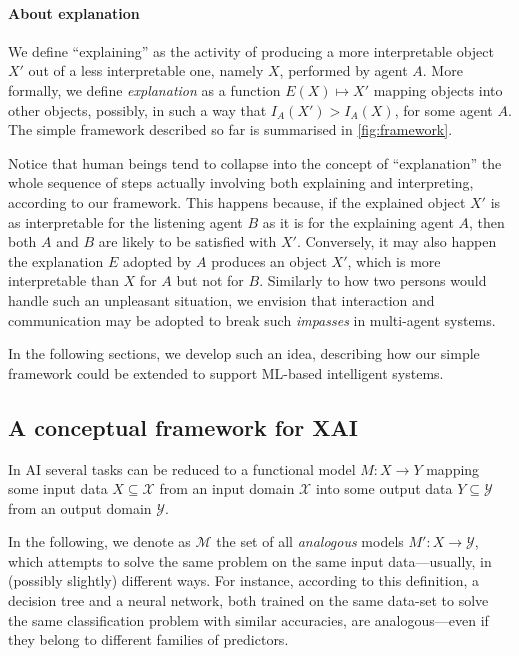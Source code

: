 \documentclass[12pt,a4paper,openright,twoside]{book}
\begin{document}
\paragraph{About explanation}

We define ``explaining'' as the activity of producing a more interpretable object $X'$ out of a less interpretable one, namely $X$, performed by agent $A$.
%
More formally, we define \emph{explanation} as a function $E(X) \mapsto X'$ mapping objects into other objects, possibly, in such a way that $I_A(X') > I_A(X)$, for some agent $A$.
%
The simple framework described so far is summarised in \cref{fig:framework}.

Notice that human beings tend to collapse into the concept of ``explanation'' the whole sequence of steps actually involving both explaining and interpreting, according to our framework.
%
This happens because, if the explained object $X'$ is as interpretable for the listening agent $B$ as it is for the explaining agent $A$, then both $A$ and $B$ are likely to be satisfied with $X'$.
%
Conversely, it may also happen the explanation $E$ adopted by $A$ produces an object $X'$, which is more interpretable than $X$ for $A$ but not for $B$.
%
Similarly to how two persons would handle such an unpleasant situation, we envision that interaction and communication may be adopted to break such \emph{impasses} in multi-agent systems.

In the following sections, we develop such an idea, describing how our simple framework could be extended to support ML-based intelligent systems.

\subsection{A conceptual framework for XAI}\label{ssec:framework}

In AI several tasks can be reduced to a functional model $M: X \rightarrow Y$ mapping some input data $X \subseteq \mathcal{X}$ from an input domain $\mathcal{X}$ into some output data $Y \subseteq \mathcal{Y}$ from an output domain $\mathcal{Y}$.

In the following, we denote as $\mathcal{M}$  the set of all \emph{analogous} models $M': X \rightarrow \mathcal{Y}$, which attempts to solve the same problem on the same input data---usually, in (possibly slightly) different ways.
%
For instance, according to this definition, a decision tree and a neural network, both trained on the same data-set to solve the same classification problem with similar accuracies, are analogous---even if they belong to different families of predictors.
\end{document}
